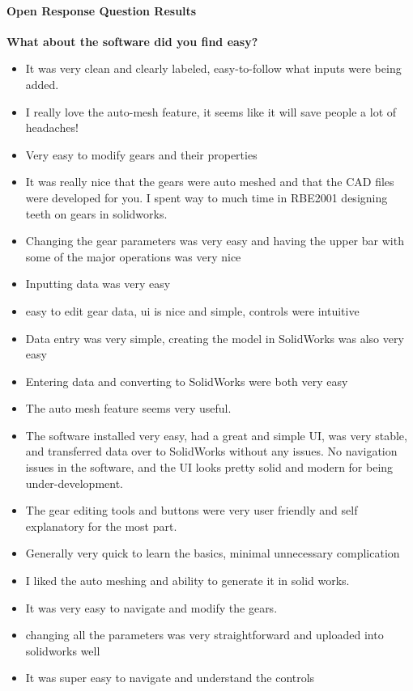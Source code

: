 \paragraph{Open Response Question Results}
\noindent\textbf{What about the software did you find easy?}
\begin{itemize}
    \item It was very clean and clearly labeled, easy-to-follow what inputs were being added.
    \item I really love the auto-mesh feature, it seems like it will save people a lot of headaches!
    \item Very easy to modify gears and their properties
    \item It was really nice that the gears were auto meshed and that the CAD files were developed for you. I spent way to much time in RBE2001 designing teeth on gears in solidworks.
    \item Changing the gear parameters was very easy and having the upper bar with some of the major operations was very nice
    \item Inputting data was very easy
    \item easy to edit gear data, ui is nice and simple, controls were intuitive 
    \item Data entry was very simple, creating the model in SolidWorks was also very easy
    \item Entering data and converting to SolidWorks were both very easy
    \item The auto mesh feature seems very useful.
    \item The software installed very easy, had a great and simple UI, was very stable, and transferred data over to SolidWorks without any issues. No navigation issues in the software, and the UI looks pretty solid and modern for being under-development.
    \item The gear editing tools and buttons were very user friendly and self explanatory for the most part.
    \item Generally very quick to learn the basics, minimal unnecessary complication
    \item I liked the auto meshing and ability to generate it in solid works.
    \item It was very easy to navigate and modify the gears.
    \item changing all the parameters was very straightforward and uploaded into solidworks well
    \item It was super easy to navigate and understand the controls

\end{itemize}
